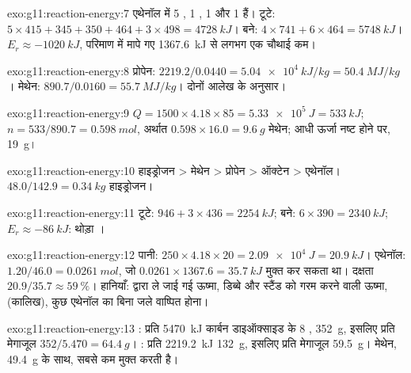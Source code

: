 \begin{solution}{exo:g11:reaction-energy:7}
एथेनॉल  में 5 , 1 , 1  और 1
 हैं। टूटे: $5 \times 415 + 345 + 350 + 464 + 3 \times 498 =
\qty{4728}{kJ}$। बने: $4 \times 741 + 6 \times 464 = \qty{5748}{kJ}$।
$E_r \approx \qty{-1020}{kJ}$, परिमाण में मापे गए \qty{1367.6}{kJ} से
लगभग एक चौथाई कम।
\end{solution}

\begin{solution}{exo:g11:reaction-energy:8}
प्रोपेन: $2219.2 / 0.0440 = \qty{5.04e4}{kJ/kg} = \qty{50.4}{MJ/kg}$।
मेथेन: $890.7 / 0.0160 = \qty{55.7}{MJ/kg}$। दोनों आलेख के अनुसार।
\end{solution}

\begin{solution}{exo:g11:reaction-energy:9}
$Q = 1500 \times 4.18 \times 85 = \qty{5.33e5}{J} = \qty{533}{kJ}$;
$n = 533 / 890.7 = \qty{0.598}{mol}$, अर्थात $0.598 \times 16.0 =
\qty{9.6}{g}$ मेथेन; आधी ऊर्जा नष्ट होने पर, \qty{19}{g}।
\end{solution}

\begin{solution}{exo:g11:reaction-energy:10}
हाइड्रोजन > मेथेन > प्रोपेन > ऑक्टेन > एथेनॉल।
$48.0 / 142.9 = \qty{0.34}{kg}$ हाइड्रोजन।
\end{solution}

\begin{solution}{exo:g11:reaction-energy:11}
टूटे: $946 + 3 \times 436 = \qty{2254}{kJ}$; बने:
$6 \times 390 = \qty{2340}{kJ}$; $E_r \approx \qty{-86}{kJ}$: थोड़ा
।
\end{solution}

\begin{solution}{exo:g11:reaction-energy:12}
पानी: $250 \times 4.18 \times 20 = \qty{2.09e4}{J} = \qty{20.9}{kJ}$।
एथेनॉल: $1.20 / 46.0 = \qty{0.0261}{mol}$, जो
$0.0261 \times 1367.6 = \qty{35.7}{kJ}$ मुक्त कर सकता था। दक्षता
$20.9 / 35.7 \approx \qty{59}{\percent}$। हानियाँ:  द्वारा ले जाई गई ऊष्मा,
डिब्बे और स्टैंड को गरम करने वाली ऊष्मा,  (कालिख),
कुछ एथेनॉल का बिना जले वाष्पित होना।
\end{solution}

\begin{solution}{exo:g11:reaction-energy:13}
: प्रति \qty{5470}{kJ} कार्बन डाइऑक्साइड के 8 ,
\qty{352}{g}, इसलिए प्रति मेगाजूल $352 / 5.470 = \qty{64.4}{g}$।
: प्रति \qty{2219.2}{kJ} \qty{132}{g},
इसलिए प्रति मेगाजूल \qty{59.5}{g}। मेथेन,
\qty{49.4}{g} के साथ, सबसे कम मुक्त करती है।
\end{solution}

